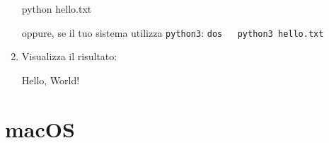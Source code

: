 \documentclass[
  letterpaper,
]{scrbook}
\newenvironment{Shaded}{\begin{snugshade}}{\end{snugshade}}
\newcommand{\NormalTok}[1]{\textcolor[rgb]{0.00,0.23,0.31}{#1}}
\begin{document}
\begin{enumerate}
\begin{Shaded}
\begin{Highlighting}[]
\NormalTok{python hello.txt}
\end{Highlighting}
\end{Shaded}

  oppure, se il tuo sistema utilizza \texttt{python3}:
  \texttt{dos\ \ \ python3\ hello.txt}
\item
  Visualizza il risultato:

\begin{Shaded}
\begin{Highlighting}[]
\NormalTok{Hello, World!}
\end{Highlighting}
\end{Shaded}
\end{enumerate}

\section{macOS}
\end{document}
